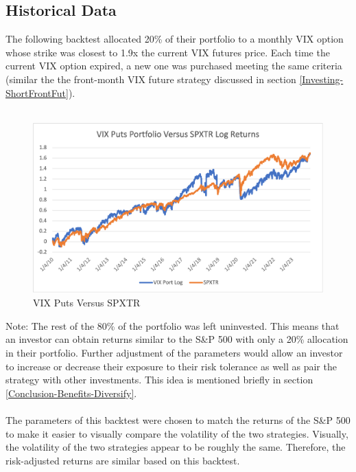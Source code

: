 \documentclass[11pt, oneside]{book}
\begin{document}
\subsection{Historical Data} \label{Investing-VIXPut-Historical}
 The following backtest allocated 20\% of their portfolio to a monthly VIX option whose strike was closest to 1.9x the current VIX futures price. Each time the current VIX option expired, a new one was purchased meeting the same criteria (similar the the front-month VIX future strategy discussed in section \ref{Investing-ShortFrontFut}).\\
\\
\begin{figure}[H]
\centering
\includegraphics[width=\textwidth]{VIXPuts.png}
\caption{VIX Puts Versus SPXTR} \label{Fig-VIXPutsVsSPXTR}
\end{figure}
\noindent
Note: The rest of the 80\% of the portfolio was left uninvested. This means that an investor can obtain returns similar to the S\&P 500 with only a 20\% allocation in their portfolio. Further adjustment of the parameters would allow an investor to increase or decrease their exposure to their risk tolerance as well as pair the strategy with other investments. This idea is mentioned briefly in section \ref{Conclusion-Benefits-Diversify}.\\
\\
The parameters of this backtest were chosen to match the returns of the S\&P 500 to make it easier to visually compare the volatility of the two strategies. Visually, the volatility of the two strategies appear to be roughly the same. Therefore, the risk-adjusted returns are similar based on this backtest.
\end{document}

